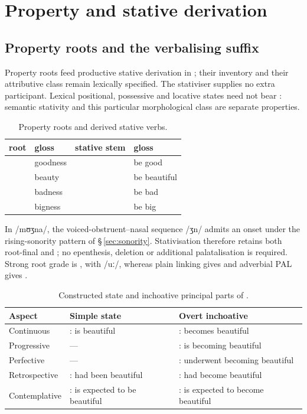 \section{Property and stative derivation}\label{sec:stative-derivation}

\subsection{Property roots and the verbalising suffix }

Property roots feed productive stative derivation in ; their
inventory and their attributive class remain lexically specified. The
stativiser supplies no extra participant. Lexical positional, possessive and
locative states need not bear : semantic stativity and this particular
morphological class are separate properties.

\begin{table}[ht]
\footnotesize
\caption{Property roots and derived stative verbs.}\label{tab:statroots}
\begin{tabularx}{\textwidth}{l L l L}
\toprule
{\sc root} & {\sc gloss} & {\sc stative stem} & {\sc gloss} \\
\midrule
{} & goodness &  & be good \\
 & beauty &  & be beautiful \\
 & badness &  & be bad \\
 & bigness &  & be big \\
\bottomrule
\end{tabularx}
\end{table}

In  /mʊʒna/, the voiced-obstruent--nasal sequence /ʒn/
admits an onset under the rising-sonority pattern of §\,\ref{sec:sonority}.
Stativisation therefore retains both root-final  and ;
no epenthesis, deletion or additional palatalisation is required. Strong
root grade is , with /uː/, whereas plain linking gives
 and adverbial PAL gives .

\begin{table}[htbp]
\footnotesize
\caption{Constructed state and inchoative principal parts of .}
\label{tab:stative-become}
\begin{tabularx}{\textwidth}{l L L}
\toprule
Aspect & Simple state & Overt inchoative \\
\midrule
Continuous & : is beautiful & : becomes beautiful \\
Progressive & --- & : is becoming beautiful \\
Perfective & --- & : underwent becoming beautiful \\
Retrospective & : had been beautiful & : had become beautiful \\
Contemplative & : is expected to be beautiful & : is expected to become beautiful \\
\bottomrule
\end{tabularx}
\end{table}


